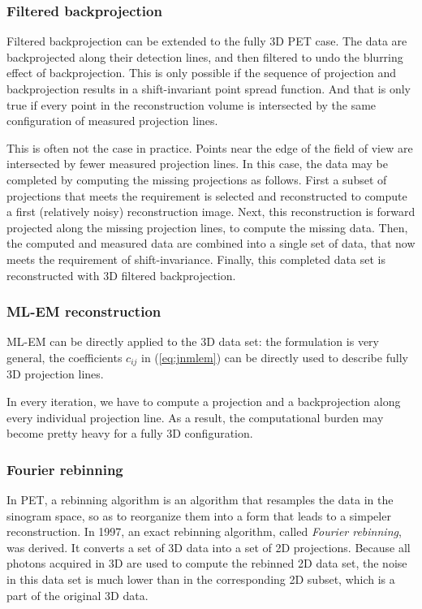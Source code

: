\documentclass[11pt,oneside]{book}
\begin{document}
\subsubsection{Filtered backprojection}
Filtered backprojection can be extended to the fully 3D PET case. The data are
backprojected along their detection lines, and then filtered to undo the
blurring effect of backprojection. This is only possible if the sequence of
projection and backprojection results in a shift-invariant point spread
function. And that is only true if every point in the reconstruction volume is
intersected by the same configuration of measured projection lines.

This is often not the case in practice. Points near the edge of the field of
view are intersected by fewer measured projection lines. In this case, the
data may be completed by computing the missing projections as follows. First a
subset of projections that meets the requirement is selected and reconstructed
to compute a first (relatively noisy) reconstruction image. Next, this
reconstruction is forward projected along the missing projection lines, to
compute the missing data. Then, the computed and measured data are combined
into a single set of data, that now meets the requirement of shift-invariance.
Finally, this completed data set is reconstructed with 3D filtered
backprojection.

\subsubsection{ML-EM reconstruction}
ML-EM can be directly applied to the 3D data set: the formulation is very
general, the coefficients $c_{ij}$ in (\ref{eq:jnmlem}) can be directly used
to describe fully 3D projection lines.

In every iteration, we have to compute a projection and a backprojection along
every individual projection line. As a result, the computational burden may
become pretty heavy for a fully 3D configuration.


\subsubsection{Fourier rebinning}
In PET, a rebinning algorithm is an algorithm that resamples the data
in the sinogram space, so as to reorganize them into a form that
leads to a simpeler reconstruction.
%
In 1997, an exact rebinning algorithm, called {\em Fourier rebinning},
was derived. It converts a set of 3D data into a set of 2D
projections. Because all photons acquired in 3D are used to compute
the rebinned 2D data set, the noise in this data set is much lower
than in the corresponding 2D subset, which is a part of the original
3D data.
\end{document}
